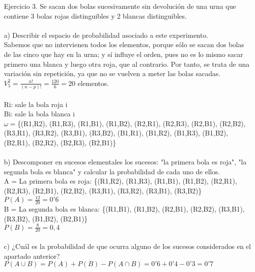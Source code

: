 \documentclass{article}
\begin{document}
Ejercicio 3. Se sacan dos bolas sucesivamente sin devolución de una urna que contiene 3 bolas rojas distinguibles y 2 blancas distinguibles. \\ \\
a) Describir el espacio de probabilidad asociado a este experimento. \\
Sabemos que no intervienen todos los elementos, porque sólo se sacan dos bolas de las cinco que hay en la urna; y sí influye el orden, pues no es lo mismo sacar primero una blanca y luego otra roja, que al contrario. Por tanto, se trata de una variación sin repetición, ya que no se vuelven a meter las bolas sacadas. \\
$V^{2}_{5} = \frac{n!}{(n-p)!}= \frac{120}{6} = 20$ elementos. \\ \\
Ri: sale la bola roja i \\
Bi: sale la bola blanca i \\
$\omega = $\{(R1,R2), (R1,R3), (R1,B1), (R1,B2), (R2,R1), (R2,R3), (R2,B1), (R2,B2), (R3,R1), (R3,R2), (R3,B1), (R3,B2), (B1,R1), (B1,R2), (B1,R3), (B1,B2), (B2,R1), (B2,R2), (B2,R3), (B2,B1)\} \\ \\
b) Descomponer en sucesos elementales los sucesos: "la primera bola es roja", "la segunda bola es blanca" y calcular la probabilidad de cada uno de ellos. \\
A = La primera bola es roja: \{(R1,R2), (R1,R3), (R1,B1), (R1,B2), (R2,R1), (R2,R3), (R2,B1), (R2,B2), (R3,R1), (R3,R2), (R3,B1), (R3,B2)\} \\
$P(A) = \frac{12}{20} = 0'6$ \\
B = La segunda bola es blanca: \{(R1,B1), (R1,B2), (R2,B1), (R2,B2), (R3,B1), (R3,B2), (B1,B2), (B2,B1)\} \\
$P(B) = \frac{8}{20} = 0,4$ \\ \\
c) ¿Cuál es la probabilidad de que ocurra alguno de los sucesos considerados en el apartado anterior? \\
$P(A\cup B) = P(A)+P(B)-P(A\cap B) = 0'6 + 0'4 - 0'3 = 0'7$ \\ \\
\end{document}
